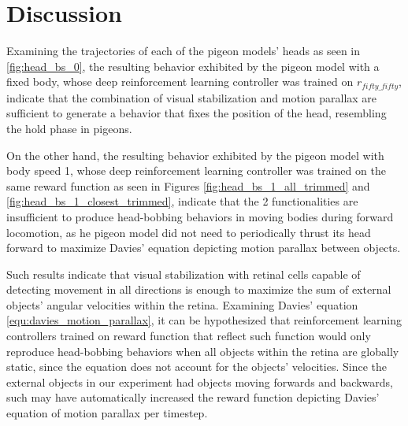 \chapter{Discussion}
  Examining the trajectories of each of the pigeon models' heads as seen in \ref{fig:head_bs_0}, the resulting behavior exhibited by the pigeon model with a fixed body, whose deep reinforcement learning controller was trained on $r_{fifty\_fifty}$, indicate that the combination of visual stabilization and motion parallax are sufficient to generate a behavior that fixes the position of the head, resembling the hold phase in pigeons.

  On the other hand, the resulting behavior exhibited by the pigeon model with body speed 1, whose deep reinforcement learning controller was trained on the same reward function as seen in Figures \ref{fig:head_bs_1_all_trimmed} and \ref{fig:head_bs_1_closest_trimmed}, indicate that the 2 functionalities are insufficient to produce head-bobbing behaviors in moving bodies during forward locomotion, as he pigeon model did not need to periodically thrust its head forward to maximize Davies' equation depicting motion parallax between objects.

  Such results indicate that visual stabilization with retinal cells capable of detecting movement in all directions is enough to maximize the sum of external objects' angular velocities within the retina.
    Examining Davies' equation \ref{equ:davies_motion_parallax}, it can be hypothesized that reinforcement learning controllers trained on reward function that reflect such function would only reproduce head-bobbing behaviors when all objects within the retina are globally static, since the equation does not account for the objects' velocities.
    Since the external objects in our experiment had objects moving forwards and backwards, such may have automatically increased the reward function depicting Davies' equation of motion parallax per timestep.





